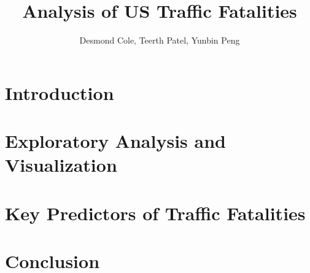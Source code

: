 \documentclass[11pt, oneside]{article}   	%
\title{Analysis of US Traffic Fatalities}
\author{Desmond Cole, Teerth Patel, Yunbin Peng}
\begin{document}
\maketitle
\section*{Introduction}

\section*{Exploratory Analysis and Visualization}

\section*{Key Predictors of Traffic Fatalities}

\section*{Conclusion}
\end{document}
